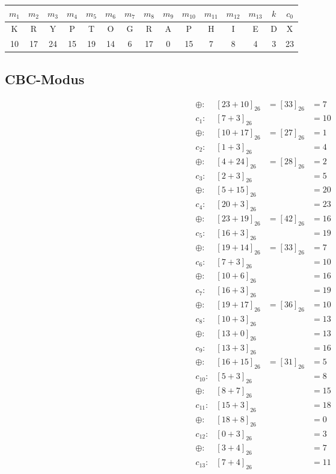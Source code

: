 \documentclass{../crypto}
\begin{document}
\begin{tabular}{ccccccccccccc|cc}
$m_1$ & $m_2$ & $m_3$ & $m_4$ & $m_5$ & $m_6$ & $m_7$ & $m_8$ & $m_9$ & $m_{10}$ & $m_{11}$ & $m_{12}$ & $m_{13}$ & $k$ & $c_0$ \\\hline
K & R & Y & P & T & O & G & R & A & P & H & I & E & D & X \\
10 & 17 & 24 & 15 & 19 & 14 & 6 & 17 & 0 & 15 & 7 & 8 & 4 & 3 & 23
\end{tabular}

\subsection{CBC-Modus}
\begin{align*}
    \oplus: & \left[23+10\right]_{26} &= \left[33\right]_{26} &= 7\\
    c_{1}: & \left[7+3\right]_{26} & &=10 \\
    \oplus: & \left[10+17\right]_{26} &= \left[27\right]_{26} &= 1\\
    c_{2}: & \left[1+3\right]_{26} & &= 4\\
    \oplus: & \left[4+24\right]_{26} &= \left[28\right]_{26} &= 2\\
    c_{3}: & \left[2+3\right]_{26} & &= 5\\
    \oplus: & \left[5+15\right]_{26} & &= 20\\
    c_{4}: & \left[20+3\right]_{26} & &= 23\\
    \oplus: & \left[23+19\right]_{26} &= \left[42\right]_{26} &= 16\\
    c_{5}: & \left[16+3\right]_{26} & &= 19\\
    \oplus: & \left[19+14\right]_{26} &= \left[33\right]_{26} &= 7\\
    c_{6}: & \left[7+3\right]_{26} & &= 10\\
    \oplus: & \left[10+6\right]_{26} & &= 16\\
    c_{7}: & \left[16+3\right]_{26} & &= 19\\
    \oplus: & \left[19+17\right]_{26} &= \left[36\right]_{26} &= 10\\
    c_{8}: & \left[10+3\right]_{26} & &= 13\\
    \oplus: & \left[13+0\right]_{26} & &= 13\\
    c_{9}: & \left[13+3\right]_{26} & &= 16\\
    \oplus: & \left[16+15\right]_{26} &= \left[31\right]_{26} &= 5\\
    c_{10}: & \left[5+3\right]_{26} & &= 8\\
    \oplus: & \left[8+7\right]_{26} & &= 15\\
    c_{11}: & \left[15+3\right]_{26} & &= 18\\
    \oplus: & \left[18+8\right]_{26} & &= 0\\
    c_{12}: & \left[0+3\right]_{26} & &= 3\\
    \oplus: & \left[3+4\right]_{26} & &= 7\\
    c_{13}: & \left[7+4\right]_{26} & &= 11
\end{align*}
\end{document}
